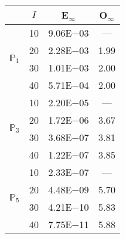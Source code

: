 \begin{table}[H]
\centering
\begin{tabular}{@{}l c c c@{}}
\toprule
 & $I$ & E$_{\infty}$ & O$_{\infty}$\\
\midrule
\multirow{4}{*}{$\mathbb{P}_{1}$}
 & 10 & 9.06E$-$03 & ---\\
 & 20 & 2.28E$-$03 & 1.99  \\
 & 30 & 1.01E$-$03 & 2.00  \\
 & 40 & 5.71E$-$04 & 2.00  \\
\midrule
\multirow{4}{*}{$\mathbb{P}_{3}$}
 & 10 & 2.20E$-$05 & ---\\
 & 20 & 1.72E$-$06 & 3.67  \\
 & 30 & 3.68E$-$07 & 3.81  \\
 & 40 & 1.22E$-$07 & 3.85  \\
\midrule
\multirow{4}{*}{$\mathbb{P}_{5}$}
 & 10 & 2.33E$-$07 & ---\\
 & 20 & 4.48E$-$09 & 5.70  \\
 & 30 & 4.21E$-$10 & 5.83  \\
 & 40 & 7.75E$-$11 & 5.88  \\
\bottomrule
\end{tabular}
\end{table}

